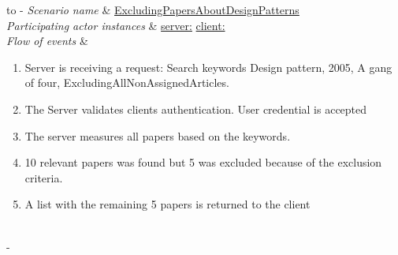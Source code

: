 \documentclass{article}
\begin{document}
%
%
\begin{table}[h!]
	\tabulinesep=1.5mm
	\begin{tabu} to 
		\tabucline[1.5pt]-
		\textit{Scenario name} & \underline{ExcludingPapersAboutDesignPatterns} \\
		\hline
		\textit{Participating actor \newline instances} & \underline{server:\serverside}
		\newline \underline{client:\clientside} \\
		\hline
		\textit{Flow of events} &
		\vspace{-3mm}
		\begin{enumerate}[leftmargin=*,topsep=0pt,itemsep=-1ex]
			\item Server is receiving a request: Search keywords {Design pattern, 2005, A gang of four}, Excluding{AllNonAssignedArticles}.
			
			\item The Server validates clients authentication. User credential is accepted
			
			\item The server measures all papers based on the keywords.
			
			\item 10 relevant papers was found but 5 was excluded because of the exclusion criteria.
			
			\item A list with the remaining 5 papers is returned to the client\\				
		\end{enumerate} \\
		\tabucline[1.5pt]-
	\end{tabu}
	\caption{Scenario when a user wants to exclude some papers.}
	\label{sc:ExcludingPapersAboutDesignPatterns}
\end{table}


%
%
\end{document}
